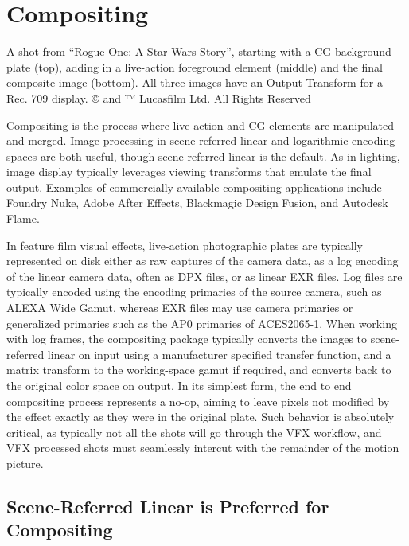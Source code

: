 \section{Compositing}%
\label{sec:compositing}




A shot from “Rogue One: A Star Wars Story”, starting with a CG background plate (top), adding in a live-action foreground element (middle) and the final composite image (bottom). All three images have an Output Transform for a Rec. 709 display.
© and ™ Lucasfilm Ltd. All Rights Reserved

Compositing is the process where live-action and CG elements are manipulated and merged. Image processing in scene-referred linear and logarithmic encoding spaces are both useful, though scene-referred linear is the default. As in lighting, image display typically leverages viewing transforms that emulate the final output. Examples of commercially available compositing applications include Foundry Nuke, Adobe After Effects, Blackmagic Design Fusion, and Autodesk Flame.

In feature film visual effects, live-action photographic plates are typically represented on disk either as raw captures of the camera data, as a log encoding of the linear camera data, often as DPX files, or as linear EXR files. Log files are typically encoded using the encoding primaries of the source camera, such as ALEXA Wide Gamut, whereas EXR files may use camera primaries or generalized primaries such as the AP0 primaries of ACES2065-1.  When working with log frames, the compositing package typically converts the images to scene-referred linear on input using a manufacturer specified transfer function, and a matrix transform to the working-space gamut if required, and converts back to the original color space on output. In its simplest form, the end to end compositing process represents a no-op, aiming to leave pixels not modified by the effect exactly as they were in the original plate. Such behavior is absolutely critical, as typically not all the shots will go through the VFX workflow, and VFX processed shots must seamlessly intercut with the remainder of the motion picture.

\subsection{Scene-Referred Linear is Preferred for Compositing}%
\label{subsec:scene-referred-linear-is-preferred-for-compositing}


